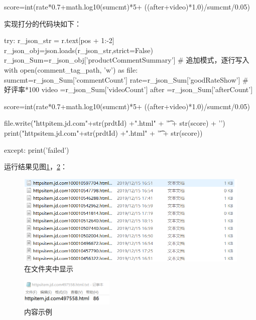 \begin{python}
score=int(rate*0.7+math.log10(sumcmt)*5+
                          ((after+video)*1.0)/sumcmt/0.05)
\end{python}

实现打分的代码块如下：
\begin{python}
    try:
        r_json_str = r.text[pos + 1:-2]
        r_json_obj=json.loads(r_json_str,strict=False)
        r_json_Sum=r_json_obj['productCommentSummary']
        # 追加模式，逐行写入
        with open(comment_tag_path, 'w') as file:
            sumcmt=r_json_Sum['commentCount']
            rate=r_json_Sum['goodRateShow'] # 好评率*100
            video =r_json_Sum['videoCount']
            after =r_json_Sum['afterCount']

            score=int(rate*0.7+math.log10(sumcmt)*5+
                          ((after+video)*1.0)/sumcmt/0.05)


            file.write("httpitem.jd.com"+str(prdtId) +".html"
                       + '\t' + str(score) + '\n')
            print("httpsitem.jd.com"+str(prdtId) +".html"
                       + '\t' + str(score))

    except:
        print('failed')
\end{python}

运行结果见图\ref{img:yhb11}，\ref{img:yhb12}：

\begin{figure}[htbp]
\centering
\includegraphics[width=13.5cm]{img/yhb/res1_jd.png}
\caption{在文件夹中显示}
\label{img:yhb11}   %
\end{figure}
\begin{figure}[htbp]
\centering
\includegraphics[width=4.5cm]{img/yhb/res2_jd.png}
\caption{内容示例}
\label{img:yhb12}   %
\end{figure}


